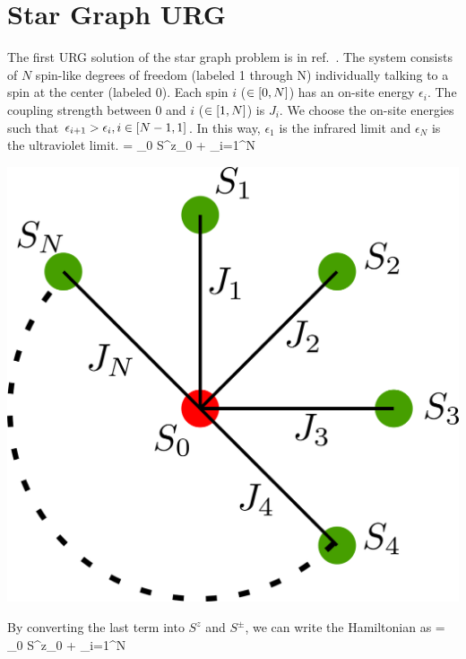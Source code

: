 \documentclass[12pt,twoside]{report}
\numberwithin{equation}{section}
\begin{document}
\section{Star Graph URG}
\begin{minipage}{260pt}
The first URG solution of the star graph problem is in ref.~\cite{spa_star}. The system consists of \(N\) spin-like degrees of freedom (labeled 1 through N) individually talking to a spin at the center (labeled 0). Each spin \(i\) (\(\in \left[{0,N}\right]\)) has an on-site energy \(\epsilon_i\). The coupling strength between 0 and \(i\) (\(\in \left[{1,N}\right]\)) is \(J_i\). We choose the on-site energies such that \(\epsilon_{i+1} > \epsilon_i, i\in\left[{N-1,1}\right]\). In this way, \(\epsilon_1\) is the infrared limit and \(\epsilon_N\) is the ultraviolet limit.
\beq
\ham = \epsilon_0 S^z_0 + \sum_{i=1}^N
\eeq
\end{minipage}
\hspace*{20pt}
\begin{minipage}{200pt}
\begin{center}
\includegraphics[scale=0.2]{../figures/stargraph_.png}
\end{center}
\end{minipage}
\pb By converting the last term into \(S^z\) and \(S^\pm\), we can write the Hamiltonian as
\beq
\ham = \epsilon_0 S^z_0 + \sum_{i=1}^N
\end{document}
